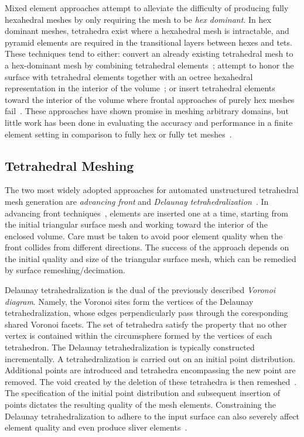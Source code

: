 Mixed element approaches attempt to alleviate the difficulty of producing fully hexahedral meshes by only requiring the mesh to be \textit{hex dominant}. In hex dominant meshes, tetrahedra exist where a hexahedral mesh is intractable, and pyramid elements are required in the transitional layers between hexes and tets. These techniques tend to either: convert an already existing tetrahedral mesh to a hex-dominant mesh by combining tetrahedral elements~\cite{baudouin_2014, gao_2017}; attempt to honor the surface with tetrahedral elements together with an octree hexahedral representation in the interior of the volume~\cite{young_2008, lobos_2015}; or insert tetrahedral elements toward the interior of the volume where frontal approaches of purely hex meshes fail~\cite{blacker_2001}. These approaches have shown promise in meshing arbitrary domains, but little work has been done in evaluating the accuracy and performance in a finite element setting in comparison to fully hex or fully tet meshes~\cite{tautges_2001}.

\subsection{Tetrahedral Meshing}
\label{Tetrahedral Meshing}

The two most widely adopted approaches for automated unstructured tetrahedral mesh generation are \textit{advancing front} and \textit{Delaunay tetrahedralization}~\cite{lohner_1997}. In advancing front techniques~\cite{jin_1993, lohner_1988}, elements are inserted one at a time, starting from the initial triangular surface mesh and working toward the interior of the enclosed volume. Care must be taken to avoid poor element quality when the front collides from different directions. The success of the approach depends on the initial quality and size of the triangular surface mesh, which can be remedied by surface remeshing/decimation.

Delaunay tetrahedralization is the dual of the previously described \textit{Voronoi diagram}. Namely, the Voronoi sites form the vertices of the Delaunay tetrahedralization, whose edges perpendicularly pass through the coresponding shared Voronoi facets. The set of tetrahedra satisfy the property that no other vertex is contained within the circumsphere formed by the vertices of each tetrahedron. The Delaunay tetrahedralization is typically constructed incrementally. A tetrahedralization is carried out on an initial point distribution. Additional points are introduced and tetrahedra encompassing the new point are removed. The void created by the deletion of these tetrahedra is then remeshed~\cite{young_2008}. The specification of the initial point distribution and subsequent insertion of points dictates the resulting quality of the mesh elements. Constraining the Delaunay tetrahedralization to adhere to the input surface can also severely affect element quality and even produce sliver elements~\cite{lohner_1997}.

